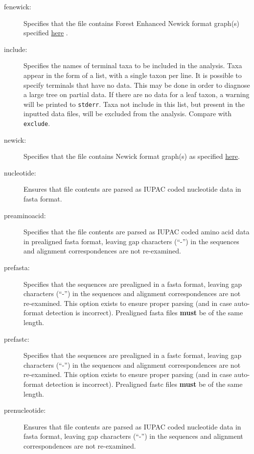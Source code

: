 \begin{description}
		\item [fenewick:] Specifies that the file contains Forest Enhanced Newick format graph(s)  
		specified \href{https://www.github.com/wardwheeler/euncon}{here} \citep{Wheeler2022}.
			
		\item [include:] Specifies the names of terminal taxa to be included in the analysis. 
		Taxa appear in the form of a list, with a single taxon per line. It is possible to specify 
		terminals that have no data. This may be done in order to diagnose a large tree on 
		partial data. If there are no data for a leaf taxon, a warning will be printed to \texttt{stderr}. 
		Taxa not include in this list, but present in the inputted data files, will be excluded from 
		the analysis. Compare with \texttt{exclude}.
			
		\item [newick:] Specifies that the file contains Newick format graph(s) as specified 
		\href{https://evolution.genetics.washington.edu/phylip/newick_doc.html}{here}.
			
		\item [nucleotide:] Ensures that file contents are parsed as IUPAC coded nucleotide data 
		in fasta \citep{PearsonandLipman1988} format.
			
		\item [preaminoacid:] Specifies that the file contents are parsed as IUPAC coded amino 
		acid data in  prealigned fasta \citep{PearsonandLipman1988} format, leaving 
		gap characters (``-'') in the sequences and alignment correspondences are not re-examined.
		
		\item [prefasta:] Specifies that the sequences are prealigned in a fasta format, leaving 
		gap characters (``-'') in the sequences and alignment correspondences are not re-examined. 
		This option exists to ensure proper parsing (and in case auto-format detection is incorrect).
		Prealigned fasta files \textbf{must} be of the same length.
			
		\item [prefastc:] Specifies that the sequences are prealigned in a fastc format, leaving gap 
		characters (``-'') in the sequences and alignment correspondences are not re-examined. 
		This option exists to ensure proper parsing (and in case auto-format detection is incorrect).
		Prealigned fastc files \textbf{must} be of the same length.			
		
		\item [prenucleotide:] Ensures that file contents are parsed as IUPAC coded nucleotide data 
		in fasta \citep{PearsonandLipman1988} format, leaving 
		gap characters (``-'') in the sequences and alignment correspondences are not re-examined.
		

\end{description}
